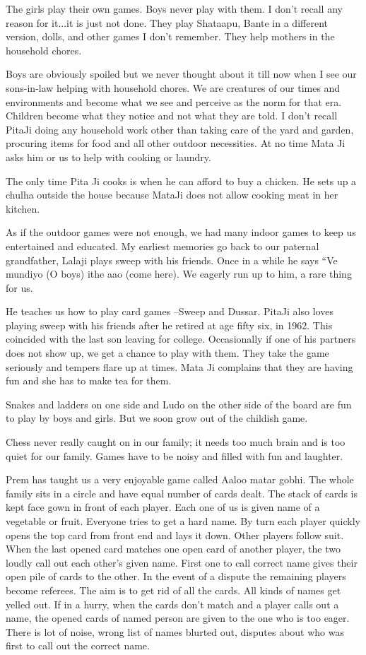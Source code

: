 The girls play their own games. Boys never play with them. I don't recall
any reason for it...it is just not done. They play Shataapu, Bante in
a different version, dolls, and other games I don't  remember. They help
mothers in the household chores. 

Boys are obviously spoiled but we never thought about it till now when
I see our sons-in-law helping with household chores. We are creatures of
our times and environments and become what we see and perceive as the norm
for that era. Children become what they notice and not what they are told.
I don't recall PitaJi doing any household work other than taking care of
the yard and garden, procuring items for food and all other outdoor
necessities. At no time Mata Ji asks him or us to help with cooking or
laundry. 

The only time Pita Ji cooks is when he can afford to buy a chicken. He
sets up a chulha outside the house because MataJi does not allow cooking
meat in her kitchen. 

As if the outdoor games were not enough, we had many indoor games to keep
us entertained and educated. My earliest memories go back to our paternal
grandfather, Lalaji plays sweep with his friends. Once in a while he says
“Ve mundiyo (O boys) ithe aao (come here). We eagerly run up to him,
a rare thing for us. 

He teaches us how to play card games --Sweep and Dussar. PitaJi also loves
playing sweep with his friends after he retired at age fifty six, in 1962.
This coincided with the last son leaving for college. Occasionally if one
of his partners does not show up, we get a chance to play with them. They
take the game seriously and tempers flare up at times. Mata Ji complains
that they are having fun and she has to make tea for them. 

Snakes and ladders on one side and Ludo on the other side of the board are
fun to play by boys and girls. But we soon grow out of the childish game. 

Chess never really caught on in our family; it needs too much brain and is
too quiet for our family. Games have to be noisy and filled with fun and
laughter. 

Prem has taught us a very enjoyable game called Aaloo matar gobhi. The
whole family sits in a circle and have equal number of cards dealt.  The
stack of cards is kept face gown in front of each player. Each one of us
is given name of a vegetable or fruit. Everyone tries to get a hard name.
By turn each player quickly opens the top card from front end and lays it
down. Other players follow suit. When the last opened card matches one
open card of another player, the two loudly call out each other's given
name. First one to call correct name gives their open pile of cards to the
other. In the event of a dispute the remaining players become referees.
The aim is to get rid of all the cards. All kinds of names get yelled out.
If in a hurry, when the cards don’t match and a  player calls out a name,
the opened cards of named person are given to the one who is too eager.
There is lot of noise, wrong list of names blurted out, disputes about who
was first to call out the correct name. 

